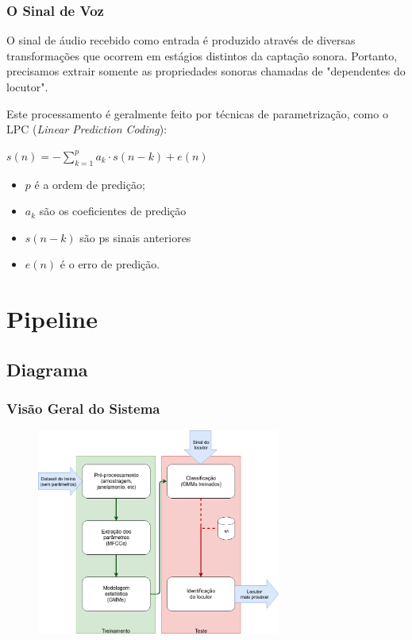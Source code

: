 \documentclass{beamer}
\begin{document}
\begin{frame} %
    \frametitle{O Sinal de Voz}
    
    O sinal de áudio recebido como entrada é produzido através de diversas transformações que ocorrem em estágios distintos da captação sonora.
    Portanto, precisamos extrair somente as propriedades sonoras chamadas de "dependentes do locutor".

    \medskip

    Este processamento é geralmente feito por técnicas de parametrização, como o LPC (\emph{Linear Prediction Coding}):

    \bigskip

    \begin{math}
        s(n) = - \sum_{k=1}^{p} a_{k} \cdot s(n-k) + e(n)
    \end{math}

    \bigskip

    \begin{itemize}
        \item $p$ é a ordem de predição;

        \item $a_{k}$  são os coeficientes de predição
    
        \item $s(n-k)$ são ps sinais anteriores
    
        \item $e(n)$ é o erro de predição.
    \end{itemize}

    


\end{frame}

\section{Pipeline}

\subsection{Diagrama}

\begin{frame} %
    \frametitle{Visão Geral do Sistema}

    \begin{figure}
        \centering
        \includegraphics[height=192pt]{fig2.png}
    \end{figure}


\end{frame}
\end{document}
